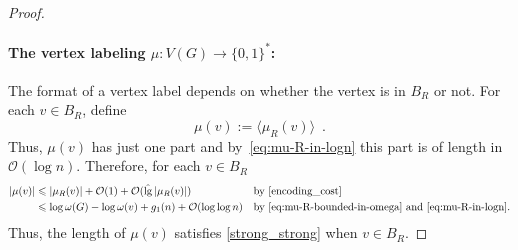\documentclass{patmorin}
\let\eqref\cref
\renewcommand{\leq}{\leqslant}
\DeclareMathOperator{\lgg}{\hat{lg}}
\newcommand{\Oh}{\calO}
\newcommand{\calO}{\mathcal{O}}
\begin{document}
\begin{proof}
    \paragraph{\boldmath The vertex labeling $\mu:V(G)\to\{0,1\}^*$:}
    The format of a vertex label depends on whether the vertex is in $B_R$ or not.
        For each $v\in B_R$, define
    \[
      \mu(v) := \langle\mu_R(v)\rangle\enspace.
    \]
    Thus, $\mu(v)$ has just one part and
    by~\eqref{eq:mu-R-in-logn} this part is of length in $\Oh(\log n)$.
    Therefore,
    for each $v\in B_R$
    \begin{align*}
    |\mu(v)| &\leq |\mu_R(v)| + \Oh(1) + \Oh(\lgg|\mu_R(v)|) &&\text{by~\eqref{encoding_cost}}\\
    &\leq \log\omega(G) - \log\omega(v) + g_1(n) + \Oh(\log\log n)&&\textrm{by~\eqref{eq:mu-R-bounded-in-omega} and~\eqref{eq:mu-R-in-logn}.}
    \end{align*}
    Thus, the length of $\mu(v)$ satisfies \eqref{strong_strong} when $v\in B_R$.



\end{proof}
\end{document}

